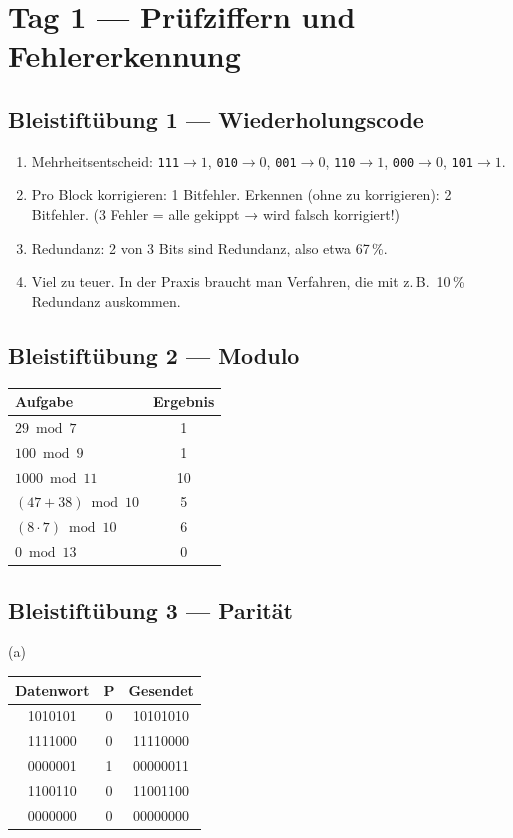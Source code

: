 \section{Tag 1 — Prüfziffern und Fehlererkennung}

\subsection*{Bleistiftübung 1 — Wiederholungscode}

\begin{enumerate}
\item Mehrheitsentscheid: \texttt{111}$\to 1$, \texttt{010}$\to 0$,
  \texttt{001}$\to 0$, \texttt{110}$\to 1$, \texttt{000}$\to 0$,
  \texttt{101}$\to 1$.
\item Pro Block korrigieren: 1 Bitfehler. Erkennen (ohne zu
  korrigieren): 2 Bitfehler. (3 Fehler = alle gekippt → wird falsch
  korrigiert!)
\item Redundanz: 2 von 3 Bits sind Redundanz, also etwa 67\,\%.
\item Viel zu teuer. In der Praxis braucht man Verfahren, die mit
  z.\,B.\ 10\,\% Redundanz auskommen.
\end{enumerate}

\subsection*{Bleistiftübung 2 — Modulo}

\begin{center}
\begin{tabular}{lc}
  \toprule
  Aufgabe & Ergebnis \\
  \midrule
  $29 \bmod 7$         & 1 \\
  $100 \bmod 9$        & 1 \\
  $1000 \bmod 11$      & 10 \\
  $(47 + 38) \bmod 10$ & 5 \\
  $(8 \cdot 7) \bmod 10$ & 6 \\
  $0 \bmod 13$         & 0 \\
  \bottomrule
\end{tabular}
\end{center}

\subsection*{Bleistiftübung 3 — Parität}

(a)
\begin{center}
\begin{tabular}{ccc}
  \toprule
  Datenwort & P & Gesendet \\
  \midrule
  1010101 & 0 & 10101010 \\
  1111000 & 0 & 11110000 \\
  0000001 & 1 & 00000011 \\
  1100110 & 0 & 11001100 \\
  0000000 & 0 & 00000000 \\
  \bottomrule
\end{tabular}
\end{center}

